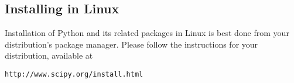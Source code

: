 %
%
%
%
%
%
%
%
%
%
% 
%
%
%


%
%
%
%

\subsection{Installing in Linux}

Installation of Python and its related packages in Linux is best done from your distribution's package manager. Please follow the instructions for your distribution, available at
\begin{verbatim}
http://www.scipy.org/install.html
\end{verbatim}

